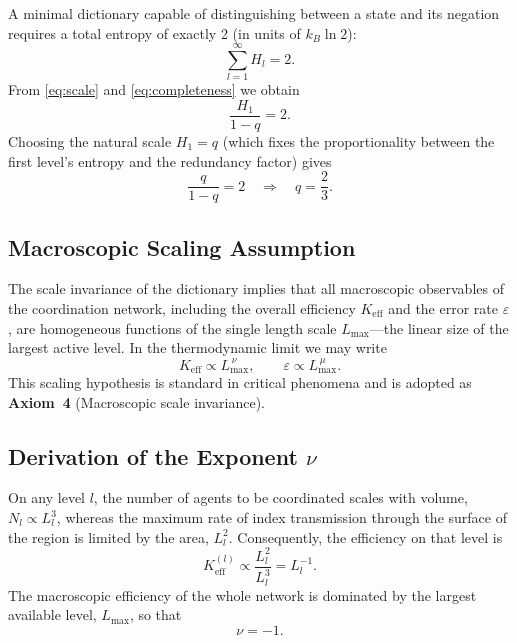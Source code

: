 \documentclass[12pt,a4paper]{article}
\begin{document}
	A minimal dictionary capable of distinguishing between a state and its negation requires a total entropy of exactly 2 (in units of \(k_B \ln 2\)):
	\begin{equation}
		\sum_{l=1}^{\infty} H_l = 2. \label{eq:completeness}
	\end{equation}
	From \eqref{eq:scale} and \eqref{eq:completeness} we obtain
	\[
	\frac{H_1}{1-q} = 2.
	\]
	Choosing the natural scale \(H_1 = q\) (which fixes the proportionality between the first level's entropy and the redundancy factor) gives
	\[
	\frac{q}{1-q} = 2 \quad\Longrightarrow\quad q = \frac{2}{3}. \label{eq:qval}
	\]
	
	\subsection{Macroscopic Scaling Assumption}
	The scale invariance of the dictionary implies that all macroscopic observables of the coordination network, including the overall efficiency \(K_{\mathrm{eff}}\) and the error rate \(\varepsilon\), are homogeneous functions of the single length scale \(L_{\max}\)—the linear size of the largest active level. In the thermodynamic limit we may write
	\begin{equation}
		K_{\mathrm{eff}} \propto L_{\max}^{\,\nu}, \qquad \varepsilon \propto L_{\max}^{\,\mu}. \label{eq:scaling-assume}
	\end{equation}
	This scaling hypothesis is standard in critical phenomena and is adopted as \textbf{Axiom~4} (Macroscopic scale invariance).
	
	\subsection{Derivation of the Exponent \(\nu\)}
	On any level \(l\), the number of agents to be coordinated scales with volume, \(N_l \propto L_l^3\), whereas the maximum rate of index transmission through the surface of the region is limited by the area, \(L_l^2\). Consequently, the efficiency on that level is
	\[
	K_{\mathrm{eff}}^{(l)} \propto \frac{L_l^2}{L_l^3} = L_l^{-1}.
	\]
	The macroscopic efficiency of the whole network is dominated by the largest available level, \(L_{\max}\), so that
	\[
	\nu = -1. \label{eq:nu}
	\]
	
\end{document}
